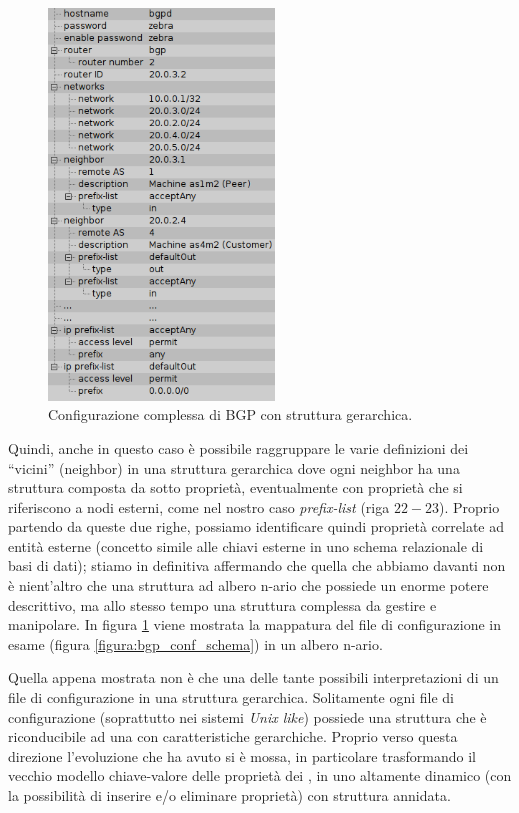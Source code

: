 \begin{figure}[!htb]
	\centering
	\includegraphics[width=6cm]{images/bgp_conf_tree.png}
	\caption{Configurazione complessa di BGP con struttura gerarchica.}
	\label{figura:bgp_conf_tree}
\end{figure}

Quindi, anche in questo caso è possibile raggruppare le varie definizioni dei ``vicini'' (neighbor) in una struttura gerarchica dove ogni neighbor ha una struttura composta da sotto proprietà, eventualmente con proprietà che si riferiscono a nodi esterni, come nel nostro caso \emph{prefix-list} (riga $22-23$). Proprio partendo da queste due righe, possiamo identificare quindi proprietà correlate ad entità esterne (concetto simile alle chiavi esterne in uno schema relazionale di basi di dati); stiamo in definitiva affermando che quella che abbiamo davanti non è nient'altro che una struttura ad albero n-ario che possiede un enorme potere descrittivo, ma allo stesso tempo una struttura complessa da gestire e manipolare. In figura \ref{figura:bgp_conf_tree} viene mostrata la mappatura del file di configurazione in esame (figura \ref{figura:bgp_conf_schema}) in un albero n-ario.

Quella appena mostrata non è che una delle tante possibili interpretazioni di un file di configurazione in una struttura gerarchica. Solitamente ogni file di configurazione (soprattutto nei sistemi \emph{Unix like}) possiede una struttura che è riconducibile ad una con caratteristiche gerarchiche. Proprio verso questa direzione l'evoluzione che \visualnetkit{} ha avuto si è mossa, in particolare trasformando il vecchio modello chiave-valore delle proprietà dei \plugin{}, in uno altamente dinamico (con la possibilità di inserire e/o eliminare proprietà) con struttura annidata.

